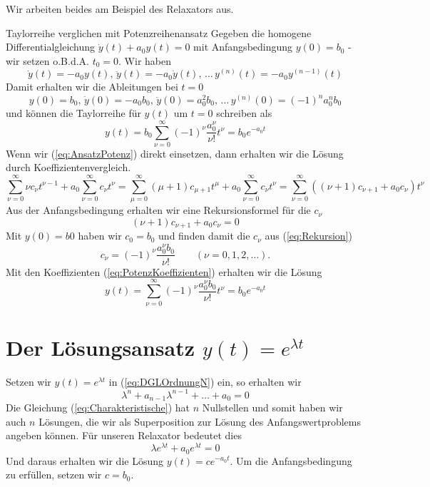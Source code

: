Wir arbeiten beides am Beispiel des Relaxators aus.
\begin{example}{Taylorreihe verglichen mit Potenzreihenansatz}
  Gegeben die homogene Differentialgleichung $\dot{y}(t)+a_0y(t)=0$ mit
  Anfangsbedingung $y(0)=b_0$ - wir setzen o.B.d.A. $t_0=0$. Wir haben
  \[ \dot{y}(t)=-a_0y(t),\, \ddot{y}(t)=-a_0\dot{y}(t),\,\dots\, 
      y^{(n)}(t)=-a_0y^{(n-1)}(t)\]
  Damit erhalten wir die Ableitungen bei $t=0$
  \[ y(0)=b_0,\, \dot{y}(0)=-a_0b_0,\, \ddot{y}(0)=a_0^2b_0,\,\dots\, 
     y^{(n)}(0)=(-1)^na_0^nb_0\]
  und können die Taylorreihe für $y(t)$ um $t=0$ schreiben als
  \begin{equation}
    y(t)=b_0\sum\limits_{\nu=0}^{\infty}(-1)^\nu\frac{a_0^\nu}{\nu!}t^\nu=b_0e^{-a_0t}
    \label{eq:SoluTaylor}
  \end{equation}
Wenn wir (\ref{eq:AnsatzPotenz}) direkt einsetzen, dann erhalten wir die Lösung
durch Koeffizientenvergleich.
  \[ \sum\limits_{\nu=0}^{\infty}\nu c_\nu t^{\nu-1}+ 
      a_0\sum\limits_{\nu=0}^{\infty}c_\nu t^\nu=
      \sum\limits_{\mu=0}^{\infty}(\mu+1)c_{\mu+1}t^\mu+ 
      a_0\sum\limits_{\nu=0}^{\infty}c_\nu t^\nu=
      \sum\limits_{\nu=0}^{\infty} \left((\nu+1)c_{\nu+1}+a_0c_\nu\right) t^\nu
  \]
  Aus der Anfangsbedingung erhalten wir eine Rekursionsformel für die $c_\nu$
  \begin{equation}
    (\nu+1)c_{\nu+1}+a_0c_\nu=0
    \label{eq:Rekursion}
  \end{equation}
  Mit $y(0)=b0$ haben wir $c_0=b_0$ und finden damit die $c_\nu$ aus
  (\ref{eq:Rekursion}) 
    \begin{equation}
      c_{\nu}=(-1)^\nu\frac{a_0^\nu b_0^{\phantom{\nu}}}{\nu!}\qquad (\nu=0,1,2,\dots).
    \label{eq:PotenzKoeffizienten}
  \end{equation}
  Mit den Koeffizienten (\ref{eq:PotenzKoeffizienten}) erhalten wir die Lösung
  \begin{equation}
    y(t)=\sum\limits_{\nu=0}^{\infty}(-1)^\nu\frac{a_0^\nu b_0^{\phantom{\nu}}}{\nu!} t^\nu=b_0e^{-a_0t}
    \label{eq:SoluPotenz}
  \end{equation}
\end{example}
%
\section{Der Lösungsansatz $y(t)=e^{\lambda t}$}
Setzen wir $y(t)=e^{\lambda t}$ in (\ref{eq:DGLOrdnungN}) ein, so erhalten wir
\begin{equation}
  \lambda^n+a_{n-1}\lambda^{n-1}+\dots +a_0=0
  \label{eq:Charakteristische}
\end{equation}
Die Gleichung (\ref{eq:Charakteristische}) hat $n$ Nullstellen und somit haben
wir auch $n$ Lösungen, die wir als Superposition zur Lösung des
Anfangswertproblems angeben können. Für unseren Relaxator bedeutet dies
\[ \lambda e^{\lambda t}+a_0e^{\lambda t}=0\]
Und daraus erhalten wir die Lösung $y(t)=ce^{-a_0 t}$. Um die Anfangsbedingung
zu erfüllen, setzen wir $c=b_0$.

